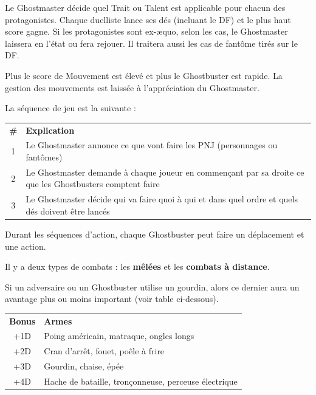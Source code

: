 \begin{frame}[b]
{\begin{minipage}[c][0.95\textheight][c]{\linewidth}
\end{minipage}
}
{
\begin{minipage}[c][0.95\textheight][c]{\linewidth}
\myindent Le Ghostmaster décide quel Trait ou Talent est applicable pour chacun des protagonistes. Chaque duelliste lance ses dés (incluant le DF) et le plus haut score gagne. Si les protagonistes sont ex-æquo, selon les cas, le Ghostmaster laissera en l'état ou fera rejouer. Il traitera aussi les cas de fantôme tirés sur le DF.


\myindent Plus le score de Mouvement est élevé et plus le Ghostbuster est rapide. La gestion des mouvements est laissée à l'appréciation du Ghostmaster.


\myindent La séquence de jeu est la suivante :

\begin{center}
\begin{tabular}{c p{7.5cm}}
\textbf{\#} & \textbf{Explication}\\
1 & Le Ghostmaster annonce ce que vont faire les PNJ (personnages ou fantômes) \\
2 & Le Ghostmaster demande à chaque joueur en commençant par sa droite ce que les Ghostbusters comptent faire \\
3 & Le Ghostmaster décide qui va faire quoi à qui et dans quel ordre et quels dés doivent être lancés \\
\end{tabular}
\end{center}

\myindent Durant les séquences d'action, chaque Ghostbuster peut faire un déplacement et une action.

\myindent Il y a deux types de combats : les \textbf{mêlées} et les \textbf{combats à distance}.



\myindent Si un adversaire ou un Ghostbuster utilise un gourdin, alors ce dernier aura un avantage plus ou moins important (voir table ci-dessous).

\begin{center}
\begin{tabular}{c p{6.5cm}}
\textbf{Bonus} & \textbf{Armes}\\
+1D & Poing américain, matraque, ongles longs \\
+2D & Cran d'arrêt, fouet, poêle à frire \\
+3D & Gourdin, chaise, épée \\
+4D & Hache de bataille, tronçonneuse, perceuse électrique \\
\end{tabular}
\end{center}


\end{minipage}}
\end{frame}

